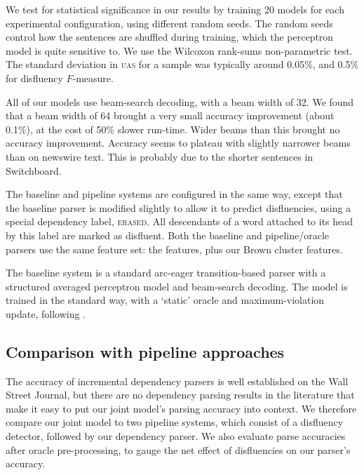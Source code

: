 \documentclass[11pt,letterpaper]{article}
\begin{document}
We test for statistical significance in our results by training 20 models for
each experimental configuration, using different random seeds. The random seeds
control how the sentences are shuffled during training, which the perceptron
model is quite sensitive to.  We use the Wilcoxon rank-sums non-parametric test.
The standard deviation in \textsc{uas} for a sample was typically around 0.05\%,
and 0.5\% for disfluency $F$-measure.

All of our models use beam-search decoding, with a beam width of 32. We found that
a beam width of 64 brought a very small accuracy improvement (about 0.1\%), at
the cost of 50\% slower run-time. Wider beams than this brought no accuracy improvement.
Accuracy seems to plateau with slightly narrower beams than on newswire text.
This is probably due to the shorter sentences in Switchboard.

The baseline and pipeline systems are configured in the same way, except that
the baseline parser is modified slightly to allow it to predict disfluencies,
using a special dependency label, \textsc{erased}.  All descendants of a word 
attached to its head by this label are marked as disfluent.
Both the baseline and pipeline/oracle parsers use the same feature set:
the \citet{zhang:11} features, plus our Brown cluster features.

The baseline system is a standard arc-eager
transition-based parser with a structured averaged perceptron model and beam-search
decoding.  The model is trained in the standard way, with a `static' oracle and
maximum-violation update, following \citep{huang:12}.


\subsection{Comparison with pipeline approaches}
\label{sec:pipeline}
The accuracy of incremental dependency parsers is well established on the Wall
Street Journal, but there are no dependency parsing results in the literature
that make it easy to put our joint model's parsing accuracy into context.
We therefore compare our joint model to two pipeline systems, which consist of 
a disfluency detector, followed by our dependency parser.
We also evaluate parse accuracies after oracle pre-processing, to
gauge the net effect of disfluencies on our parser's accuracy.
\end{document}
